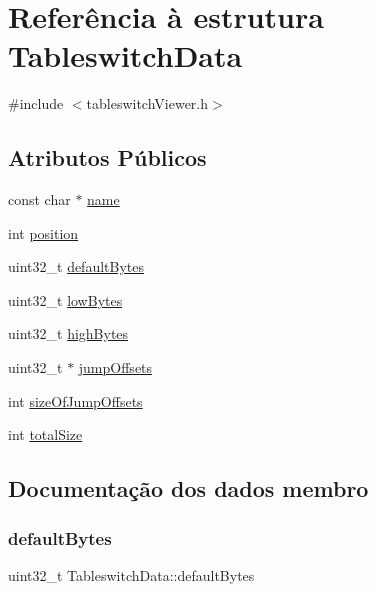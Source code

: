 \hypertarget{struct_tableswitch_data}{}\section{Referência à estrutura Tableswitch\+Data}
\label{struct_tableswitch_data}


{\ttfamily \#include $<$tableswitch\+Viewer.\+h$>$}

\subsection*{Atributos Públicos}
\begin{DoxyCompactItemize}
\item 
const char $\ast$ \hyperlink{struct_tableswitch_data_ab6d07b5a3cfc2a5b057b2cac64b091bc}{name}
\item 
int \hyperlink{struct_tableswitch_data_ada868ee85ea6b04b2bf1030243321b50}{position}
\item 
uint32\+\_\+t \hyperlink{struct_tableswitch_data_a3aa8d330093f0a55e0863464e8f6ff7b}{default\+Bytes}
\item 
uint32\+\_\+t \hyperlink{struct_tableswitch_data_af55eea8baa6d2baf2c874bb281dba4d9}{low\+Bytes}
\item 
uint32\+\_\+t \hyperlink{struct_tableswitch_data_a0c2af310d1de13d7e81d5a80a8780cc9}{high\+Bytes}
\item 
uint32\+\_\+t $\ast$ \hyperlink{struct_tableswitch_data_aa126b1ceb364ac3284b69d7597abdc7b}{jump\+Offsets}
\item 
int \hyperlink{struct_tableswitch_data_a1b6e4dc45c22bbeb94350bad630659ea}{size\+Of\+Jump\+Offsets}
\item 
int \hyperlink{struct_tableswitch_data_a3307b28129c7614fa88231d7f3c47b30}{total\+Size}
\end{DoxyCompactItemize}


\subsection{Documentação dos dados membro}
\hypertarget{struct_tableswitch_data_a3aa8d330093f0a55e0863464e8f6ff7b}{}\label{struct_tableswitch_data_a3aa8d330093f0a55e0863464e8f6ff7b} 
\subsubsection{\texorpdfstring{default\+Bytes}{defaultBytes}}
{\footnotesize\ttfamily uint32\+\_\+t Tableswitch\+Data\+::default\+Bytes}

